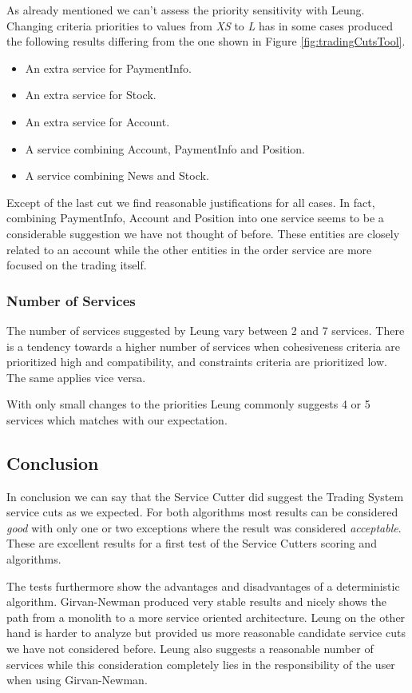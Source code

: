 As already mentioned we can't assess the priority sensitivity with Leung. Changing criteria priorities to values from \textit{XS} to \textit{L} has in some cases produced the following results differing from the one shown in Figure \ref{fig:tradingCutsTool}.

\begin{itemize}
	\item An extra service for PaymentInfo.
	\item An extra service for Stock.
	\item An extra service for Account.
	\item A service combining Account, PaymentInfo and Position.
	\item A service combining News and Stock.
\end{itemize}

Except of the last cut we find reasonable justifications for all cases. In fact, combining PaymentInfo, Account and Position into one service seems to be a considerable suggestion we have not thought of before. These entities are closely related to an account while the other entities in the order service are more focused on the trading itself. 

\subsubsection{Number of Services}

The number of services suggested by Leung vary between 2 and 7 services. There is a tendency towards a higher number of services when cohesiveness criteria are prioritized high and compatibility, and constraints criteria are prioritized low. The same applies vice versa. 

With only small changes to the priorities Leung commonly suggests 4 or 5 services which matches with our expectation. %

\subsection{Conclusion}

In conclusion we can say that the Service Cutter did suggest the Trading System service cuts as we expected. For both algorithms most results can be considered \textit{good} with only one or two exceptions where the result was considered \textit{acceptable}. These are excellent results for a first test of the Service Cutters scoring and algorithms. 

The tests furthermore show the advantages and disadvantages of a deterministic algorithm. Girvan-Newman produced very stable results and nicely shows the path from a monolith to a more service oriented architecture. Leung on the other hand is harder to analyze but provided us more reasonable candidate service cuts we have not considered before. Leung also suggests a reasonable number of services while this consideration completely lies in the responsibility of the user when using Girvan-Newman.


